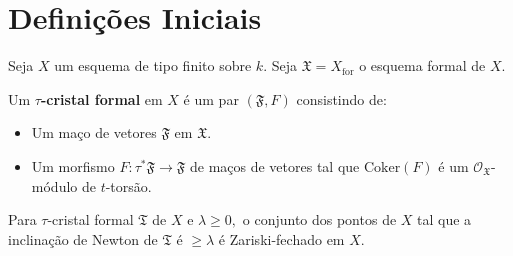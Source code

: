 \documentclass[11pt,twoside,a4paper]{book}
\begin{document}
\section{Definições Iniciais}

Seja $X$ um esquema de tipo finito sobre $k.$ Seja $\mathfrak{X}=X_{\mathrm{for}}$ o esquema formal de $X.$

\begin{definicao}
Um \textbf{$\tau$-cristal formal} em $X$ é um par $(\mathfrak{F},F)$ consistindo de:
\begin{itemize}
\item Um maço de vetores $\mathfrak{F}$ em $\mathfrak{X}.$ 
\item Um morfismo $F:\tau^*\mathfrak{F}\rightarrow\mathfrak{F}$ de maços de vetores tal que $\mathrm{Coker}(F)$ é um $\mathcal{O}_\mathfrak{X}$-módulo de $t$-torsão.
\end{itemize}
\end{definicao}

\begin{teorema}
Para $\tau$-cristal formal $\mathfrak{T}$ de $X$ e $\lambda\geq 0,$ o conjunto dos pontos de $X$ tal que a inclinação de Newton de $\mathfrak{T}$ é $\geq\lambda$ é Zariski-fechado em $X.$
\end{teorema}

\printindex
\end{document}
